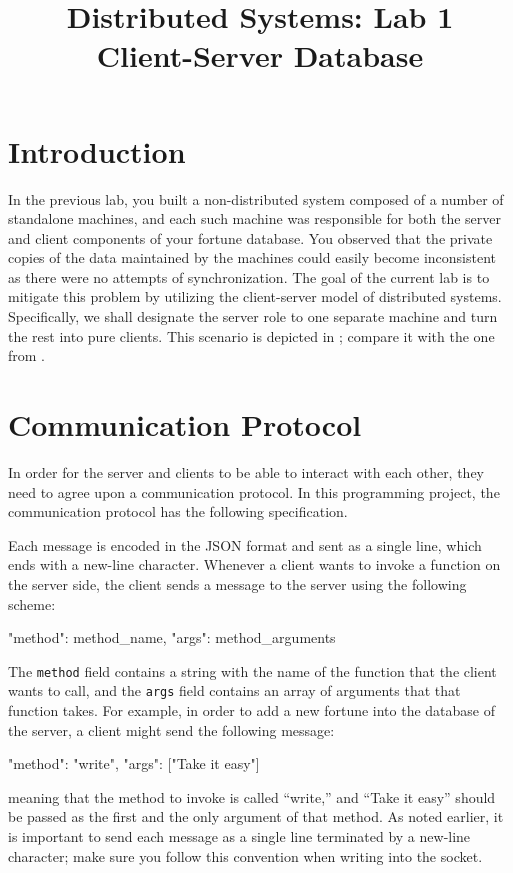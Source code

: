 \documentclass[a4paper]{article}
\title{%
  Distributed Systems: Lab 1\\%
  Client-Server Database%
}
\author{}
\begin{document}
\maketitle

\section{Introduction}

In the previous lab, you built a non-distributed system composed of a number of
standalone machines, and each such machine was responsible for both the server
and client components of your fortune database. You observed that the private
copies of the data maintained by the machines could easily become inconsistent
as there were no attempts of synchronization. The goal of the current lab is to
mitigate this problem by utilizing the client-server model \cite{lecture2} of
distributed systems. Specifically, we shall designate the server role to one
separate machine and turn the rest into pure clients. This scenario is depicted
in ; compare it with the one from .

\section{Communication Protocol} 
In order for the server and clients to be able to interact with each other, they
need to agree upon a communication protocol. In this programming project, the
communication protocol has the following specification.

Each message is encoded in the JSON format \cite{json, python-json} and sent as
a single line, which ends with a new-line character. Whenever a client wants to
invoke a function on the server side, the client sends a message to the server
using the following scheme:
\begin{json}
{
    "method": method_name,
    "args": method_arguments
}
\end{json}
The \texttt{method} field contains a string with the name of the function that
the client wants to call, and the \texttt{args} field contains an array of
arguments that that function takes. For example, in order to add a new fortune
into the database of the server, a client might send the following message:
\begin{json}
{
    "method": "write",
    "args": ["Take it easy"]
}
\end{json}
meaning that the method to invoke is called ``write,'' and ``Take it easy''
should be passed as the first and the only argument of that method. As noted
earlier, it is important to send each message as a single line terminated by a
new-line character; make sure you follow this convention when writing into the
socket.
\end{document}
